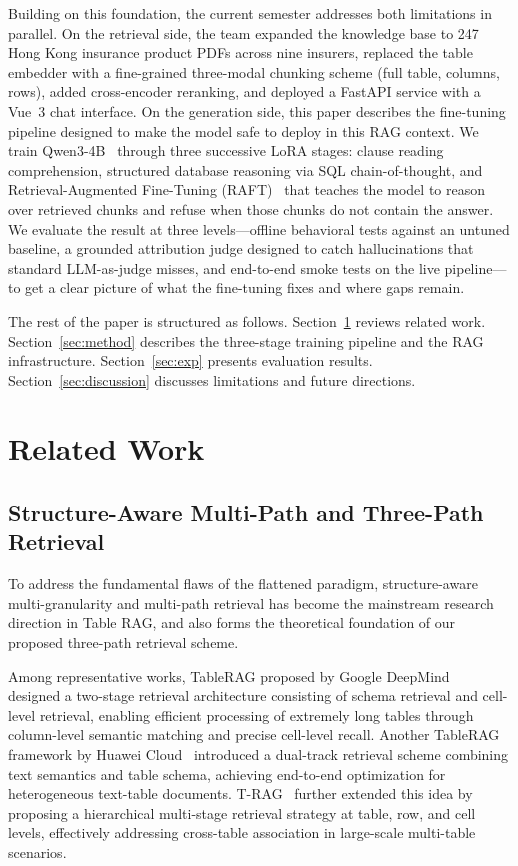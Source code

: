 \documentclass[10pt,conference]{IEEEtran}
\begin{document}
Building on this foundation, the current semester addresses both limitations
in parallel.
On the retrieval side, the team expanded the knowledge base to 247 Hong Kong
insurance product PDFs across nine insurers, replaced the table embedder with
a fine-grained three-modal chunking scheme (full table, columns, rows), added
cross-encoder reranking, and deployed a FastAPI service with a Vue~3 chat
interface.
On the generation side, this paper describes the fine-tuning pipeline designed
to make the model safe to deploy in this RAG context.
We train Qwen3-4B~\cite{qwen3} through three successive LoRA stages: clause
reading comprehension, structured database reasoning via SQL chain-of-thought,
and Retrieval-Augmented Fine-Tuning (RAFT)~\cite{zhang2024raft} that teaches
the model to reason over retrieved chunks and refuse when those chunks do not
contain the answer.
We evaluate the result at three levels---offline behavioral tests against an
untuned baseline, a grounded attribution judge designed to catch hallucinations
that standard LLM-as-judge misses, and end-to-end smoke tests on the live
pipeline---to get a clear picture of what the fine-tuning fixes and where gaps
remain.

The rest of the paper is structured as follows.
Section~\ref{sec:related} reviews related work.
Section~\ref{sec:method} describes the three-stage training pipeline and
the RAG infrastructure.
Section~\ref{sec:exp} presents evaluation results.
Section~\ref{sec:discussion} discusses limitations and future directions.


\section{Related Work}\label{sec:related}



\subsection{Structure-Aware Multi-Path and Three-Path Retrieval}

To address the fundamental flaws of the flattened paradigm, structure-aware multi-granularity and multi-path retrieval has become the mainstream research direction in Table RAG, and also forms the theoretical foundation of our proposed three-path retrieval scheme.

Among representative works, TableRAG proposed by Google DeepMind~\cite{tablerag}  designed a two-stage retrieval architecture consisting of schema retrieval and cell-level retrieval, enabling efficient processing of extremely long tables through column-level semantic matching and precise cell-level recall. Another TableRAG framework by Huawei Cloud~\cite{tablerag} introduced a dual-track retrieval scheme combining text semantics and table schema, achieving end-to-end optimization for heterogeneous text-table documents. T-RAG~\cite{trag} further extended this idea by proposing a hierarchical multi-stage retrieval strategy at table, row, and cell levels, effectively addressing cross-table association in large-scale multi-table scenarios.
\end{document}
